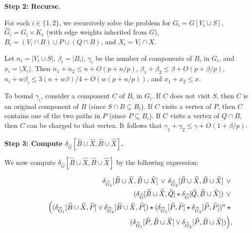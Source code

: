 \par
\par\medskip\noindent\textbf{Step 2: Recurse.}\par
For each $i\in\{1,2\}$, we recursively solve the problem for $G_{i}=G[V_{i}\cup S]$, ${\widehat{G}}_{i}=G_{i}\times K_{c}$ (with edge weights inherited from ${\widehat{G}}$), $B_{i}=(V_{i}\cap B)\cup P\cup(Q\cap B)$, and $X_{i}=V_{i}\cap X$.
\par
\par
Let $n_{i}=|V_{i}\cup S|$, $\beta_{i}=|B_{i}|$, $\gamma_{i}$ be the number of components of $B_{i}$ in $G_{i}$, and $x_{i}=|X_{i}|$. Then $n_{1}+n_{2}\leq n+O(p+n/p)$, $\beta_{1}+\beta_{2}\leq\beta+O(p+\beta/p)$, $n_{i}+w\beta_{i}\leq 3(n+w\beta)/4+O(w(p+n/p))$, and $x_{1}+x_{2}\leq x$.
\par
\par
To bound $\gamma_{i}$, consider a component $C$ of $B_{i}$ in $G_{i}$. If $C$ does not visit $S$, then $C$ is an original component of $B$ (since $S\cap B\subseteq B_{i}$). If $C$ visits a vertex of $P$, then $C$ contains one of the two paths in $P$ (since $P\subseteq B_{i}$). If $C$ visits a vertex of $Q\cap B$, then $C$ can be charged to that vertex. It follows that $\gamma_{1}+\gamma_{2}\leq\gamma+O(1+\beta/p)$.
\par
\par
\par\medskip\noindent\textbf{Step 3: Compute $\delta_{\widehat{G}}[\widehat{B}\cup\widehat{X},\widehat{B}\cup\widehat{X}]$.}\par
We now compute $\delta_{\widehat{G}}[\widehat{B}\cup\widehat{X},\widehat{B}\cup\widehat{X}]$ by the following expression:
\par
\[\begin{aligned}
\displaystyle\delta_{{\widehat{G}}_{1}}[\widehat{B}\cup\widehat{X},\widehat{B}%
\cup\widehat{X}]\,\vee\,\delta_{{\widehat{G}}_{2}}[\widehat{B}\cup\widehat{X},%
\widehat{B}\cup\widehat{X}]\,\vee{} \\
\displaystyle(\delta_{\widehat{G}}[\widehat{B}\cup\widehat{X},\widehat{Q}]%
\star\delta_{\widehat{G}}[\widehat{Q},\widehat{B}\cup\widehat{X}])\,\vee{} \\
\displaystyle\Big((\delta_{{\widehat{G}}_{1}}[\widehat{B}\cup\widehat{X},%
\widehat{P}]\vee\delta_{{\widehat{G}}_{2}}[\widehat{B}\cup\widehat{X},\widehat%
{P}])\star(\delta_{{\widehat{G}}_{1}}[\widehat{P},\widehat{P}]\star\delta_{{%
\widehat{G}}_{2}}[\widehat{P},\widehat{P}])^{n}\star{} \\
\displaystyle\qquad\qquad\qquad\qquad\qquad\qquad\qquad\qquad(\delta_{{%
\widehat{G}}_{1}}[\widehat{P},\widehat{B}\cup\widehat{X}]\vee\delta_{{\widehat%
{G}}_{2}}[\widehat{P},\widehat{B}\cup\widehat{X}])\Big),
\end{aligned}\]
